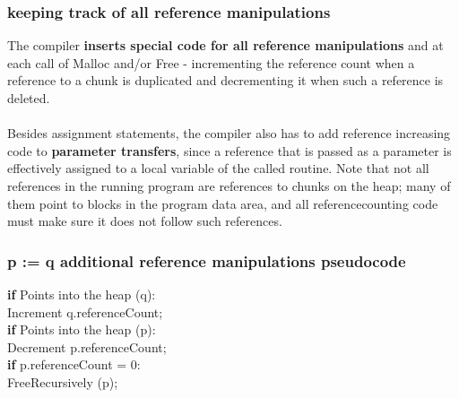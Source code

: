 \documentclass[presentation]{beamer}
\begin{document}
\begin{frame}
  \frametitle{keeping track of all
reference manipulations}
  \justifying  
  The compiler \textbf{inserts special code for all reference manipulations} and at each call of Malloc and/or Free - incrementing
the reference count when a reference to a chunk is duplicated and decrementing it
when such a reference is deleted. 
	\\~\\
	Besides assignment statements,
the compiler also has to add reference increasing code to \textbf{parameter transfers}, since
a reference that is passed as a parameter is effectively assigned to a local variable of
the called routine. Note that not all references in the running program are references to chunks on
the heap; many of them point to blocks in the program data area, and all referencecounting code must make sure it does not follow such references.
\end{frame}


\begin{frame}
  \frametitle{p := q additional reference manipulations pseudocode}
  \justifying
  \begin{block}{}
  \textbf{if} Points into the heap (q):\\ \hspace*{20pt} Increment q.referenceCount;\\ \textbf{if} Points into the heap (p):\\ \hspace*{20pt} Decrement p.referenceCount;\\ \hspace*{20pt} \textbf{if} p.referenceCount = 0:\\ \hspace*{40pt} FreeRecursively (p);
  \end{block}
\end{frame}  
\end{document}
